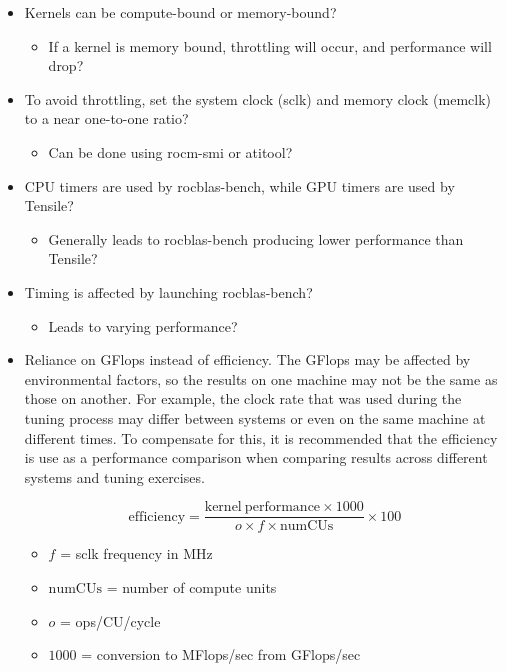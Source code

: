 \documentclass[]{article}
\begin{document}
\begin{itemize}

\item Kernels can be compute-bound or memory-bound?
	
 \begin{itemize}
 	\item If a kernel is memory bound, throttling will occur, and performance will drop?
 \end{itemize}

\item To avoid throttling, set the system clock (sclk) and memory clock (memclk) to a near one-to-one ratio?

  \begin{itemize}
  	\item Can be done using rocm-smi or atitool?
  \end{itemize}

\item CPU timers are used by rocblas-bench, while GPU timers are used by Tensile?

  \begin{itemize}
   	\item Generally leads to rocblas-bench producing lower performance than Tensile?
  \end{itemize}

\item Timing is affected by launching rocblas-bench?

  \begin{itemize}
  	\item Leads to varying performance?
  \end{itemize}

\item Reliance on GFlops instead of efficiency. The GFlops may be affected by environmental factors, so the results on one machine may not be the same as those on another. For example, the clock rate that was used during the tuning process may differ between systems or even on the same machine at different times. To compensate for this, it is recommended that the efficiency is use as a performance comparison when comparing results across different systems and tuning exercises. 

$$ \mathrm{efficiency} = \frac{\mathrm{kernel\ performance} \times 1000}{o \times f \times \mathrm{numCUs}} \times 100 $$

\begin{itemize}
	\item $f$ = sclk frequency in MHz
	\item $\mathrm{numCUs}$ = number of compute units
	\item $o$ = ops/CU/cycle
	\item $1000$ = conversion to MFlops/sec from GFlops/sec
\end{itemize}
  

\end{itemize}
\end{document}

